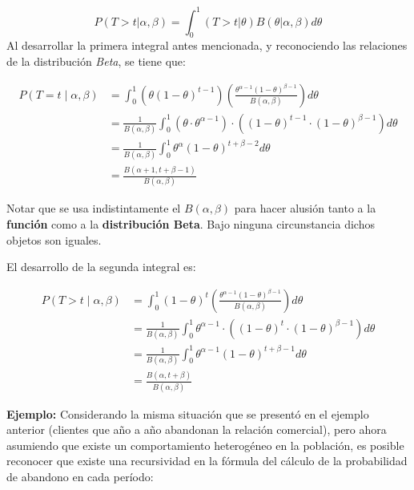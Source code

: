 \documentclass[
]{book}
\begin{document}
\[P(T>t|\alpha,\beta) = \int_0^1 (T>t|\theta)B(\theta|\alpha,\beta)d\theta\]
Al desarrollar la primera integral antes mencionada, y reconociendo las
relaciones de la distribución \emph{Beta}, se tiene que:

\[
\begin{aligned} P(T = t \mid \alpha, \beta) &= \int_0^1 \left( \theta(1-\theta)^{t-1} \right) \left( \frac{\theta^{\alpha-1}(1-\theta)^{\beta-1}}{B(\alpha, \beta)} \right) d\theta \\ &= \frac{1}{B(\alpha, \beta)} \int_0^1 (\theta \cdot \theta^{\alpha-1}) \cdot ((1-\theta)^{t-1} \cdot (1-\theta)^{\beta-1}) d\theta \\ &= \frac{1}{B(\alpha, \beta)} \int_0^1 \theta^{\alpha} (1-\theta)^{t+\beta-2} d\theta \\ &= \frac{B(\alpha+1, t+\beta-1)}{B(\alpha, \beta)} \end{aligned}
\]

Notar que se usa indistintamente el \(B(\alpha,\beta)\) para hacer alusión
tanto a la \textbf{función} como a la \textbf{distribución Beta}. Bajo ninguna
circunstancia dichos objetos son iguales.

El desarrollo de la segunda integral es:

\[
\begin{aligned}
P(T > t \mid \alpha, \beta) &= \int_0^1 (1-\theta)^{t} \left( \frac{\theta^{\alpha-1}(1-\theta)^{\beta-1}}{B(\alpha, \beta)} \right) d\theta \\
&= \frac{1}{B(\alpha, \beta)} \int_0^1 \theta^{\alpha-1} \cdot ((1-\theta)^{t} \cdot (1-\theta)^{\beta-1}) d\theta \\
&= \frac{1}{B(\alpha, \beta)} \int_0^1 \theta^{\alpha-1} (1-\theta)^{t+\beta-1} d\theta \\
&= \frac{B(\alpha, t+\beta)}{B(\alpha, \beta)}
\end{aligned}
\]

\textbf{Ejemplo:} Considerando la misma situación que se presentó en el
ejemplo anterior (clientes que año a año abandonan la relación
comercial), pero ahora asumiendo que existe un comportamiento
heterogéneo en la población, es posible reconocer que existe una
recursividad en la fórmula del cálculo de la probabilidad de abandono en
cada período:
\end{document}
